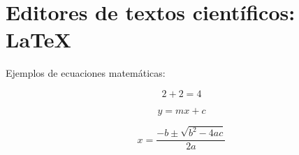 \documentclass[review]{elsarticle}
\begin{document}
\section{Editores de textos científicos: LaTeX}

Ejemplos de ecuaciones matemáticas:\cite{WEBSITE:3}


$$2+2=4$$

\begin{equation} \label{eq:Linearecta}
y=mx+c
\end{equation}

\begin{equation}\label{eq:Raizcuadrada}
x=\frac{-b\pm \sqrt{b^2-4ac}}{2a}
\end{equation}



\end{document}
